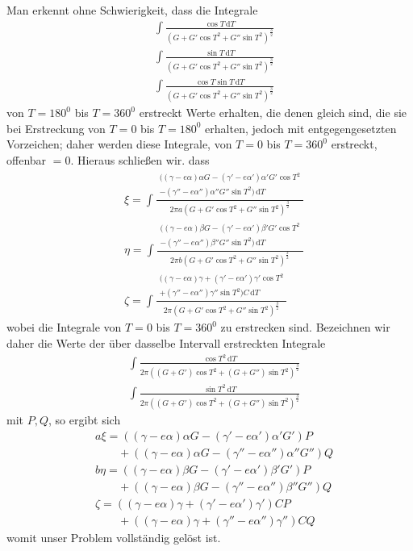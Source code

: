 Man erkennt ohne Schwierigkeit, dass die Integrale
\[
\begin{aligned}
&\int\frac{\cos T\,\mathrm dT}{(G+G'\cos T^2+G''\sin T^2)^{\frac32}}\\[8pt]
&\int\frac{\sin T\,\mathrm dT}{(G+G'\cos T^2+G''\sin T^2)^{\frac32}}\\[8pt]
&\int\frac{\cos T\sin T\,\mathrm dT}{(G+G'\cos T^2+G''\sin T^2)^{\frac32}}
\end{aligned}
\]
von $T=180^0$ bis $T=360^0$ erstreckt Werte erhalten, die denen gleich sind, die sie bei Erstreckung von $T=0$ bis $T=180^0$ erhalten, jedoch mit entgegengesetzten Vorzeichen; daher werden diese Integrale, von $T=0$ bis $T=360^0$ erstreckt, offenbar $=0$. Hieraus schließen wir. dass
\[
\begin{aligned}
&\xi{}=\int\frac{\begin{gathered}((\gamma-e\alpha)\alpha G-(\gamma'-e\alpha')\alpha'G'\cos T^2\\-(\gamma''-e\alpha'')\alpha''G''\sin T^2)\,\mathrm dT\end{gathered}}{2\pi a(G+G'\cos T^2+G''\sin T^2)^{\frac32}}\\[8pt]
&\eta{}=\int\frac{\begin{gathered}((\gamma-e\alpha)\beta G-(\gamma'-e\alpha')\beta'G'\cos T^2\\-(\gamma''-e\alpha'')\beta''G''\sin T^2)\,\mathrm dT\end{gathered}}{2\pi b(G+G'\cos T^2+G''\sin T^2)^{\frac32}}\\[8pt]
&\zeta{}=\int\frac{\begin{gathered}((\gamma-e\alpha)\gamma+(\gamma'-e\alpha')\gamma'\cos T^2\\+(\gamma''-e\alpha'')\gamma''\sin T^2)C\,\mathrm dT\end{gathered}}{2\pi(G+G'\cos T^2+G''\sin T^2)^{\frac32}}
\end{aligned}
\]
wobei die Integrale von $T=0$ bis $T=360^0$ zu erstrecken sind. Bezeichnen wir daher die Werte der über dasselbe Intervall erstreckten Integrale
\[
\begin{aligned}
&\int\frac{\cos T^2\,\mathrm dT}{2\pi((G+G')\cos T^2+(G+G'')\sin T^2)^{\frac32}}\\[8pt]
&\int\frac{\sin T^2\,\mathrm dT}{2\pi((G+G')\cos T^2+(G+G'')\sin T^2)^{\frac32}}
\end{aligned}
\]
mit $P,Q$, so ergibt sich
\[
\begin{aligned}
&a\xi=((\gamma-e\alpha)\alpha G-(\gamma'-e\alpha')\alpha'G')P\\[6pt]
&\qquad{}+((\gamma-e\alpha)\alpha G-(\gamma''-e\alpha'')\alpha''G'')Q\\[8pt]
&b\eta=((\gamma-e\alpha)\beta G-(\gamma'-e\alpha')\beta'G')P\\[6pt]
&\qquad{}+((\gamma-e\alpha)\beta G-(\gamma''-e\alpha'')\beta''G'')Q\\[8pt]
&\zeta=((\gamma-e\alpha)\gamma+(\gamma'-e\alpha')\gamma')CP\\[6pt]
&\qquad{}+((\gamma-e\alpha)\gamma+(\gamma''-e\alpha'')\gamma'')CQ
\end{aligned}
\]
womit unser Problem vollständig gelöst ist.
\clearpage
\endgroup
